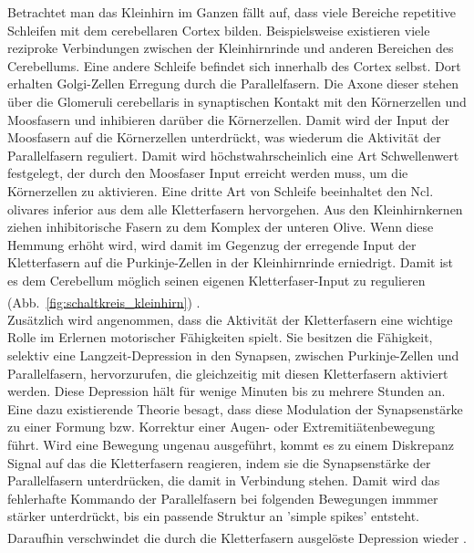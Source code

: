 Betrachtet man das Kleinhirn im Ganzen fällt auf, dass viele Bereiche repetitive Schleifen mit dem cerebellaren Cortex bilden. Beispielsweise existieren viele reziproke Verbindungen zwischen der Kleinhirnrinde und anderen Bereichen des Cerebellums. Eine andere Schleife befindet sich innerhalb des Cortex selbst. Dort erhalten Golgi-Zellen Erregung durch die Parallelfasern. Die Axone dieser stehen über die Glomeruli cerebellaris in synaptischen Kontakt mit den Körnerzellen und Moosfasern und inhibieren darüber die Körnerzellen. Damit wird der Input der Moosfasern auf die Körnerzellen unterdrückt, was wiederum die Aktivität der Parallelfasern reguliert. Damit wird höchstwahrscheinlich eine Art Schwellenwert festgelegt, der durch den Moosfaser Input erreicht werden muss, um die Körnerzellen zu aktivieren. Eine dritte Art von Schleife beeinhaltet den Ncl. olivares inferior aus dem alle Kletterfasern hervorgehen. Aus den Kleinhirnkernen ziehen inhibitorische Fasern zu dem Komplex der unteren Olive. Wenn diese Hemmung erhöht wird, wird damit im Gegenzug der erregende Input der Kletterfasern auf die Purkinje-Zellen in der Kleinhirnrinde erniedrigt. Damit ist es dem Cerebellum möglich seinen eigenen Kletterfaser-Input zu regulieren (Abb.~\ref{fig:schaltkreis_kleinhirn}) \textsuperscript{\cite[Kap.~42]{kandel2013principles}}.\\ 
Zusätzlich wird angenommen, dass die Aktivität der Kletterfasern eine wichtige Rolle im Erlernen motorischer Fähigkeiten spielt. Sie besitzen die Fähigkeit, selektiv eine Langzeit-Depression in den Synapsen, zwischen Purkinje-Zellen und Parallelfasern, hervorzurufen, die gleichzeitig mit diesen Kletterfasern aktiviert werden. Diese Depression hält für wenige Minuten bis zu mehrere Stunden an. Eine dazu existierende Theorie besagt, dass diese Modulation der Synapsenstärke zu einer Formung bzw. Korrektur einer Augen- oder  Extremitiätenbewegung führt. Wird eine Bewegung ungenau ausgeführt, kommt es zu einem Diskrepanz Signal auf das die Kletterfasern reagieren, indem sie die Synapsenstärke der Parallelfasern unterdrücken, die damit in Verbindung stehen. Damit wird das fehlerhafte Kommando der Parallelfasern bei folgenden Bewegungen immmer stärker unterdrückt, bis ein passende Struktur an 'simple spikes' entsteht. Daraufhin verschwindet die durch die Kletterfasern ausgelöste Depression wieder \textsuperscript{\cite[Kap.~42]{kandel2013principles}}.   

